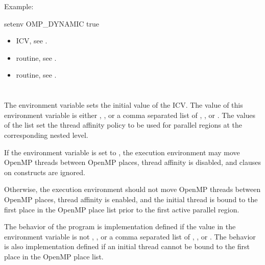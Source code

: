 Example:
\begin{boxedcode}
setenv OMP\_DYNAMIC true
\end{boxedcode}

\crossreferences
\begin{itemize}
\item {} ICV, see .

\item {} routine, see .

\item {} routine, see .
\end{itemize}









\section{}
\label{sec:OMP_PROC_BIND}
The  environment variable sets the initial value of the  ICV. 
The value of this environment variable is either , , or a comma separated 
list of , , or . The values of the list set the thread affinity policy 
to be used for parallel regions at the corresponding nested level.

If the environment variable is set to , the execution environment may move 
OpenMP threads between OpenMP places, thread affinity is disabled, and  
clauses on  constructs are ignored.

Otherwise, the execution environment should not move OpenMP threads between 
OpenMP places, thread affinity is enabled, and the initial thread is bound to the first 
place in the OpenMP place list prior to the first active parallel region.

The behavior of the program is implementation defined if the value in the 
 environment variable is not , , or a comma separated 
list of , , or . The behavior is also implementation defined if an 
initial thread cannot be bound to the first place in the OpenMP place list.

